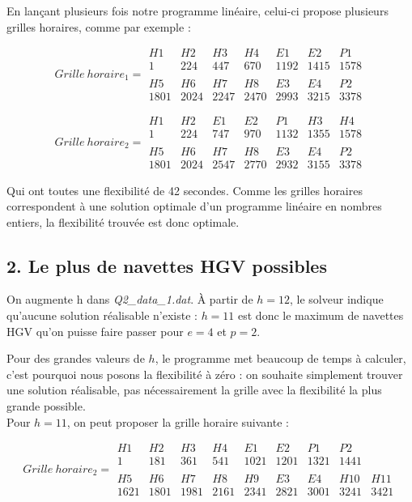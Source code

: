 \documentclass{rapport}
\begin{document}
En lançant plusieurs fois notre programme linéaire, celui-ci propose plusieurs grilles horaires, comme par exemple :

\[Grille \  horaire_1 =
\begin{matrix}
H1 & H2 & H3 & H4 & E1 & E2 & P1 \\
1 & 224 & 447 & 670 & 1192 & 1415 & 1578 \\
\ \\
H5 & H6 & H7 & H8 & E3 & E4 & P2 \\
1801 & 2024 & 2247 & 2470 & 2993 & 3215 & 3378
\end{matrix}
\]

\[Grille \  horaire_2 =
\begin{matrix}
H1 & H2 & E1 & E2 & P1 & H3 & H4 \\
1 & 224 & 747 & 970 & 1132 & 1355 & 1578 \\
\ \\
H5 & H6 & H7 & H8 & E3 & E4 & P2 \\
1801 & 2024 & 2547 & 2770 & 2932 & 3155 & 3378
\end{matrix}
\]


Qui ont toutes une flexibilité de 42 secondes. Comme les grilles horaires correspondent à une solution optimale d'un programme linéaire en nombres entiers, la flexibilité trouvée est donc optimale.

\subsection{2. Le plus de navettes HGV possibles}
On augmente h dans \emph{Q2\_data\_1.dat}. À partir de $h=12$, le solveur indique qu'aucune solution réalisable n'existe : $h=11$ est donc le maximum de navettes HGV qu'on puisse faire passer pour $e=4$ et $p=2$.

Pour des grandes valeurs de $h$, le programme met beaucoup de temps à calculer, c'est pourquoi nous posons la flexibilité à zéro : on souhaite simplement trouver une solution réalisable, pas nécessairement la grille avec la flexibilité la plus grande possible. \\
Pour $h=11$, on peut proposer la grille horaire suivante :


\[Grille \  horaire_2 =
\begin{matrix}
H1 & H2 & H3 & H4 & E1 & E2 & P1 & P2 \\
1 & 181 & 361 & 541 & 1021 & 1201 & 1321 & 1441\\
\ \\
H5 & H6 & H7 & H8 & H9 & E3 & E4 & H10 & H11 \\
1621 & 1801 & 1981 & 2161 & 2341 & 2821 & 3001 & 3241 & 3421
\end{matrix}
\]
\end{document}
